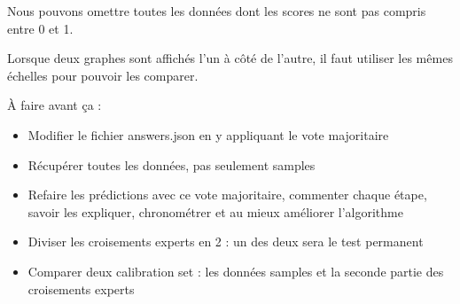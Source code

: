 \documentclass[french]{article}
\begin{document}
Nous pouvons omettre toutes les données dont les scores ne sont pas compris entre 0 et 1.

\vspace{0.2cm}

Lorsque deux graphes sont affichés l'un à côté de l'autre, il faut utiliser les mêmes échelles pour pouvoir les comparer.

\vspace{0.2cm}

À faire avant ça :
\begin{itemize}
    \item Modifier le fichier answers.json en y appliquant le vote majoritaire
    \item Récupérer toutes les données, pas seulement samples
    \item Refaire les prédictions avec ce vote majoritaire, commenter chaque étape, savoir les expliquer, chronométrer et au mieux améliorer l'algorithme
    \item Diviser les croisements experts en 2 : un des deux sera le test permanent
    \item Comparer deux calibration set : les données samples et la seconde partie des croisements experts
\end{itemize}
\end{document}
